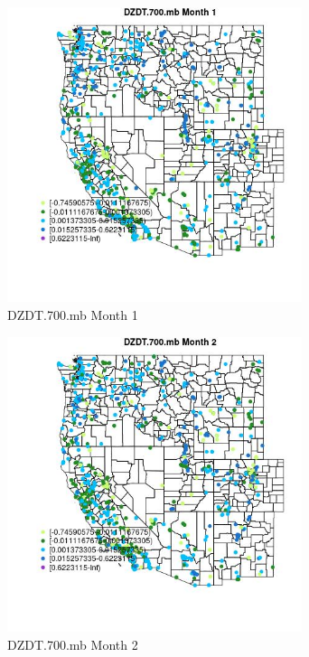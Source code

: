 \begin{figure} 
\centering  
\includegraphics[width=0.77\textwidth]{Code_Outputs/Report_ML_input_PM25_Step4_part_f_de_duplicated_aveswNAs_MapObsMo1DZDT700mb.jpg} 
\caption{\label{fig:Report_ML_input_PM25_Step4_part_f_de_duplicated_aveswNAsMapObsMo1DZDT700mb}DZDT.700.mb Month 1} 
\end{figure} 
 

\begin{figure} 
\centering  
\includegraphics[width=0.77\textwidth]{Code_Outputs/Report_ML_input_PM25_Step4_part_f_de_duplicated_aveswNAs_MapObsMo2DZDT700mb.jpg} 
\caption{\label{fig:Report_ML_input_PM25_Step4_part_f_de_duplicated_aveswNAsMapObsMo2DZDT700mb}DZDT.700.mb Month 2} 
\end{figure} 
 

